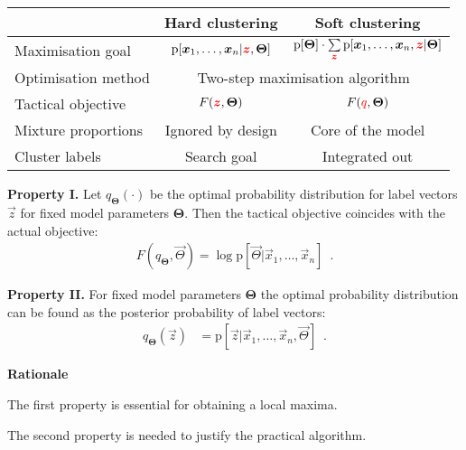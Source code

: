\documentclass[landscape,footrule]{foils}
\newcommand{\pd}[1]{\mathrm{p}[#1]}
\begin{document}
\titlefoil


\hspace*{-0.3cm}
\begin{tabular}{|l|c|c|}
\hline
& Hard clustering & Soft clustering\\
\hline
Maximisation goal \rule[-0.75cm]{0cm}{2cm}
& $\pd{\vec{x}_1,\ldots,\vec{x}_n|\textcolor{red}{\vec{z}},\vec{\Theta}}$
& $\pd{\vec{\Theta}}\cdot
  \sum\limits_{\textcolor{red}{\vec{z}}}\pd{\vec{x}_1,\ldots,\vec{x}_n,\textcolor{red}{\vec{z}}|\vec{\Theta}}$\\
\hline
Optimisation method \rule[-0.75cm]{0cm}{2cm}\hspace*{-1cm}
& \multicolumn{2}{|c|}{Two-step maximisation algorithm}\\
\hline
Tactical objective\rule[-0.75cm]{0cm}{2cm}
& $F(\textcolor{red}{\vec{z}},\vec{\Theta})$
& $F(\textcolor{red}{q},\vec{\Theta})$\\
\hline
Mixture proportions \rule[-0.75cm]{0cm}{2cm}
& Ignored by design
& Core of the model\\
\hline 
Cluster labels \rule[-0.75cm]{0cm}{2cm}
& Search goal
& Integrated out\\
\hline 
\end{tabular}


\textbf{Property I.}
Let $q_{\boldsymbol{\Theta}}(\cdot)$ be the optimal probability distribution for label vectors $\vec{z}$ for fixed model parameters $\boldsymbol{\Theta}$. Then the tactical objective coincides with the actual objective:
\begin{align*}
 F(q_{\boldsymbol{\Theta}},\vec{\Theta})=\log \pd{\vec{\Theta}|\vec{x}_1,\ldots,\vec{x}_n}\enspace.
\end{align*}

\textbf{Property II.}
For fixed model parameters $\boldsymbol{\Theta}$ the optimal probability distribution can be found as the posterior probability of label vectors:
\begin{align*}
q_{\boldsymbol{\Theta}}(\vec{z})&=\pd{\vec{z}|\vec{x}_1,\ldots,\vec{x}_n, \vec{\Theta}}\enspace.
\end{align*}\vspace*{-3ex}

\textbf{Rationale}
\begin{triangles}
\item The first property is essential for obtaining a local maxima. 
\item The second property is needed to justify the practical algorithm. 
\vspace*{-1ex}
\end{triangles}  
\end{document}
